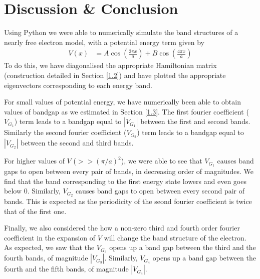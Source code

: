 \documentclass[12pt,a4paper]{article}
\begin{document}
\section{Discussion \& Conclusion}
Using Python we were able to numerically simulate the band structures of a nearly free electron model, with a potential energy term given by
\begin{align*}
    V(x) &= A\cos\left(\frac{2\pi x}{a}\right) + B\cos\left(\frac{4\pi x}{a}\right)
\end{align*}
To do this, we have diagonalised the appropriate Hamiltonian matrix (construction detailed in Section \ref{1.2}) and have plotted the appropriate eigenvectors corresponding to each energy band.

For small values of potential energy, we have numerically been able to obtain values of bandgap as we estimated in Section \ref{1.3}. The first fourier coefficient ($V_{G_1}$) term leads to a bandgap equal to $|V_{G_1}|$ between the first and second bands. Similarly the second fourier coefficient ($V_{G_2}$) term leads to a bandgap equal to $|V_{G_2}|$ between the second and third bands.

For higher values of $V$ ($>> (\pi/a)^2$), we were able to see that $V_{G_1}$ causes band gaps to open between every pair of bands, in decreasing order of magnitudes. We find that the band corresponding to the first energy state lowers and even goes below 0. Similarly, $V_{G_2}$ causes band gaps to open between every second pair of bands. This is expected as the periodicity of the seond fourier coefficient is twice that of the first one. 

Finally, we also considered the how a non-zero third and fourth order fourier coefficient in the expansion of $V$ will change the band structure of the electron. As expected, we saw that the $V_{G_3}$ opens up a band gap between the third and the fourth bands, of magnitude $|V_{G_3}|$. Similarly, $V_{G_4}$ opens up a band gap between the fourth and the fifth bands, of magnitude $|V_{G_4}|$.

\end{document}
